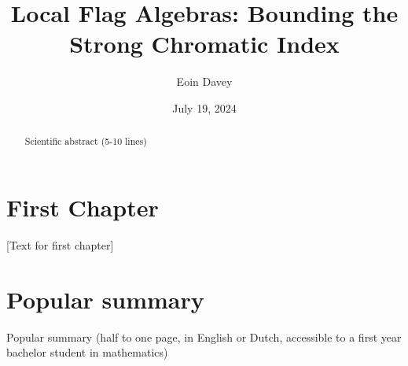 \documentclass{uvamath}
\title{Local Flag Algebras: Bounding the Strong Chromatic Index} %
\author[eoin.davey@student.uva.nl, 14246287]{Eoin Davey} %
\date{July 19, 2024} %
\begin{document}
\maketitle

\begin{abstract}
Scientific abstract (5-10 lines)
\end{abstract}

\tableofcontents



\chapter{First Chapter}
[Text for first chapter]


\chapter*{Popular summary}
Popular summary (half to one page, in English or Dutch, accessible to a first year bachelor student in mathematics)

\printbibliography{}
\end{document}
